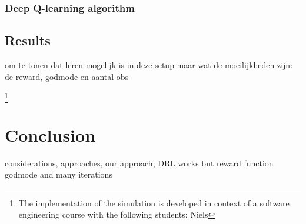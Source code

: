 \documentclass[\home/main.tex]{subfiles}
\begin{document}
\subsubsection{Deep Q-learning algorithm}

\subsection{Results}
\tiny{om te tonen dat leren mogelijk is in deze setup maar wat de moeilijkheden zijn: de reward, godmode en aantal obs}

\footnote{The implementation of the simulation is developed in context of a software engineering course with the following students: Niels  }


\section{Conclusion }
{\tiny considerations, approaches, our approach, DRL works but reward function godmode and many iterations}

\end{document}
